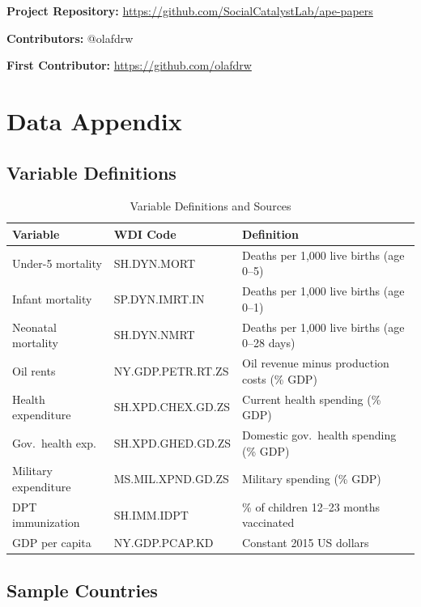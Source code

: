 \documentclass[12pt]{article}
\begin{document}
\noindent\textbf{Project Repository:} \url{https://github.com/SocialCatalystLab/ape-papers}

\noindent\textbf{Contributors:} @olafdrw

\noindent\textbf{First Contributor:} \url{https://github.com/olafdrw}

\label{apep_main_text_end}
\newpage


\newpage
\appendix

\section{Data Appendix}
\label{app:data}

\subsection{Variable Definitions}

\begin{table}[H]
\centering
\caption{Variable Definitions and Sources}
\label{tab:variables}
\begin{tabular}{lll}
\toprule
Variable & WDI Code & Definition \\
\midrule
Under-5 mortality & SH.DYN.MORT & Deaths per 1,000 live births (age 0--5) \\
Infant mortality & SP.DYN.IMRT.IN & Deaths per 1,000 live births (age 0--1) \\
Neonatal mortality & SH.DYN.NMRT & Deaths per 1,000 live births (age 0--28 days) \\
Oil rents & NY.GDP.PETR.RT.ZS & Oil revenue minus production costs (\% GDP) \\
Health expenditure & SH.XPD.CHEX.GD.ZS & Current health spending (\% GDP) \\
Gov.\ health exp. & SH.XPD.GHED.GD.ZS & Domestic gov.\ health spending (\% GDP) \\
Military expenditure & MS.MIL.XPND.GD.ZS & Military spending (\% GDP) \\
DPT immunization & SH.IMM.IDPT & \% of children 12--23 months vaccinated \\
GDP per capita & NY.GDP.PCAP.KD & Constant 2015 US dollars \\
\bottomrule
\end{tabular}
\end{table}

\subsection{Sample Countries}
\end{document}
